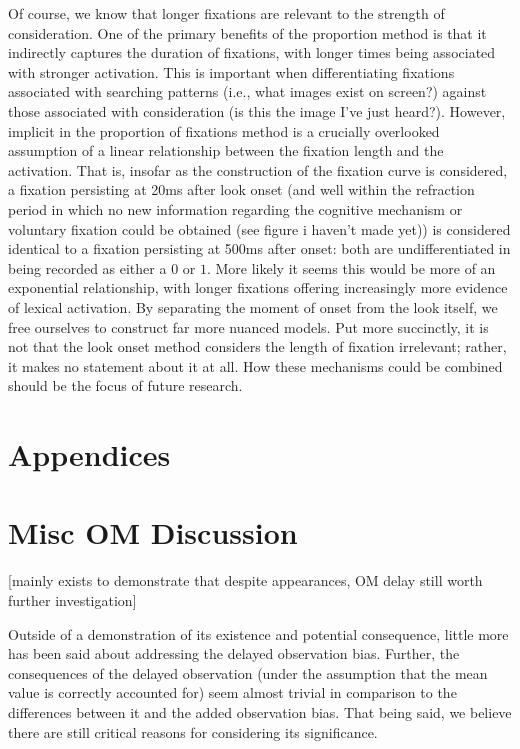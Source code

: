 \documentclass{article}
\begin{document}
Of course, we know that longer fixations are relevant to the strength of consideration. One of the primary benefits of the proportion method is that it indirectly captures the duration of fixations, with longer times being associated with stronger activation. This is important when differentiating fixations associated with searching patterns (i.e., what images exist on screen?) against those associated with consideration (is this the image I've just heard?). However, implicit in the proportion of fixations method is a crucially overlooked assumption of a linear relationship between the fixation length and the activation. That is, insofar as the construction of the fixation curve is considered, a fixation persisting at 20ms after look onset (and well within the refraction period in which no new information regarding the cognitive mechanism or voluntary fixation could be obtained (see figure i haven't made yet)) is considered identical to a fixation persisting at 500ms after onset: both are undifferentiated in being recorded as either a $0$ or $1$. More likely it seems this would be more of an exponential relationship, with longer fixations offering increasingly more evidence of lexical activation. By separating the moment of onset from the look itself, we free ourselves to construct far more nuanced models. Put more succinctly, it is not that the look onset method considers the length of fixation irrelevant; rather, it makes no statement about it at all. How these mechanisms could be combined should be the focus of future research.






\section*{Appendices}


\section{Misc OM Discussion}

[mainly exists to demonstrate that despite appearances, OM delay still worth further investigation]

Outside of a demonstration of its existence and potential consequence, little more has been said about addressing the delayed observation bias. Further, the consequences of the delayed observation (under the assumption that the mean value is correctly accounted for) seem almost trivial in comparison to the differences between it and the added observation bias. That being said, we believe there are still critical reasons for considering its significance.
\end{document}
